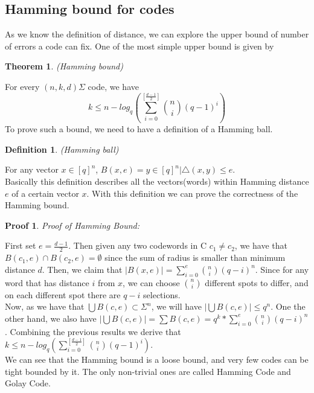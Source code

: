 \documentclass{article}
\newtheorem{Definition}{Definition}
\newtheorem{Theorem}{Theorem}
\newtheorem{Proof}{Proof}
\begin{document}
\subsection{Hamming bound for codes}
As we know the definition of distance, we can explore the upper bound of number of errors a code can fix. One of the most simple upper bound is given by
\begin{Theorem}(Hamming bound)\end{Theorem}
\noindent For every $(n,k,d) \Sigma$ code, we have
\begin{equation}
k \le n - log_q(\sum_{i=0}^{[\frac{d-1}{2}]}{n \choose i} (q-1)^i)
\end{equation}
To prove such a bound, we need to have a definition of a Hamming ball.
\begin{Definition}(Hamming ball)\end{Definition}
\noindent For any vector $x \in [q]^n$,
$B(x,e) = {y \in [q]^n | \bigtriangleup (x,y) \le e}$.\\
Basically this definition describes all the vectors(words) within Hamming distance $e$ of a certain vector $x$. With this definition we can prove the correctness of the Hamming bound.\\
\begin{Proof}Proof of Hamming Bound: \end{Proof} 
\noindent First set $e = \frac{d-1}{2}$. Then given any two codewords in C $c_1 \neq c_2$, we have that $B(c_1,e) \cap B(c_2,e) = \emptyset$ since the sum of radius is smaller than minimum distance $d$. Then, we claim that $|B(x,e)| = \sum_{i=0}^{e} {n \choose i}(q-i)^n$. Since for any word that has distance $i$ from $x$, we can choose ${n \choose i}$ different spots to differ, and on each different spot there are $q-i$ selections.\\
Now, as we have that $\bigcup B(c,e) \subset \Sigma^n$, we will have $|\bigcup B(c,e)| \le q^n$. One the other hand, we also have $|\bigcup B(c,e)| = \sum B(c,e) = q^k* \sum_{i=0}^{e} {n \choose i}(q-i)^n$. Combining the previous results we derive that $k \le n - log_q(\sum_{i=0}^{[\frac{d-1}{2}]}{n \choose i} (q-1)^i)$.\\
We can see that the Hamming bound is a loose bound, and very few codes can be tight bounded by it. The only non-trivial ones are called Hamming Code and Golay Code.\\
\end{document}
